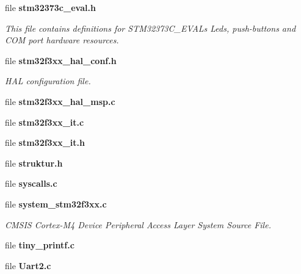 \begin{DoxyCompactItemize}
file \textbf{ stm32373c\+\_\+eval.\+h}
\begin{DoxyCompactList}\small\item\em This file contains definitions for S\+T\+M32373\+C\+\_\+\+E\+V\+AL\textquotesingle{}s Leds, push-\/buttons and C\+OM port hardware resources. \end{DoxyCompactList}\item 
file \textbf{ stm32f3xx\+\_\+hal\+\_\+conf.\+h}
\begin{DoxyCompactList}\small\item\em H\+AL configuration file. \end{DoxyCompactList}\item 
file \textbf{ stm32f3xx\+\_\+hal\+\_\+msp.\+c}
\item 
file \textbf{ stm32f3xx\+\_\+it.\+c}
\item 
file \textbf{ stm32f3xx\+\_\+it.\+h}
\item 
file \textbf{ struktur.\+h}
\item 
file \textbf{ syscalls.\+c}
\item 
file \textbf{ system\+\_\+stm32f3xx.\+c}
\begin{DoxyCompactList}\small\item\em C\+M\+S\+IS Cortex-\/\+M4 Device Peripheral Access Layer System Source File. \end{DoxyCompactList}\item 
file \textbf{ tiny\+\_\+printf.\+c}
\item 
file \textbf{ Uart2.\+c}
\end{DoxyCompactItemize}
